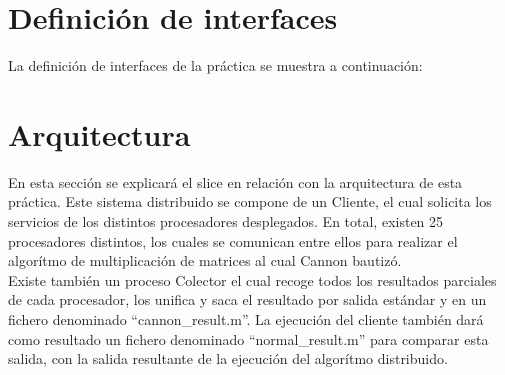 
\section{Definición de interfaces}

La definición de interfaces de la práctica se muestra a continuación:







\section{Arquitectura}
En esta sección se explicará el slice en relación con la arquitectura de esta práctica.
Este sistema distribuido se compone de un Cliente, el cual solicita los servicios de los distintos procesadores desplegados.
En total, existen 25 procesadores distintos, los cuales se comunican entre ellos para realizar el algorítmo de multiplicación de matrices al cual Cannon bautizó.\\
 Existe también un proceso Colector el cual recoge todos los resultados parciales de cada procesador, los unifica y saca el resultado por salida estándar y en un fichero denominado ``cannon\_result.m''. La ejecución del cliente también dará como resultado un fichero denominado ``normal\_result.m'' para comparar esta salida, con la salida resultante de la ejecución del algorítmo distribuido.


